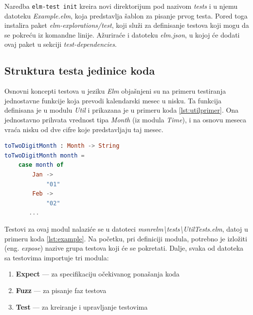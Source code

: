 \documentclass[12pt,oneside]{memoir}
\begin{document}
Naredba \texttt{elm-test init} kreira novi direktorijum pod nazivom \emph{tests} i u njemu datoteku \emph{Example.elm}, koja predstavlja šablon za pisanje prvog testa. Pored toga instalira paket \emph{elm-explorations/test}, koji služi za definisanje testova koji mogu da se pokreću iz komandne linije. Ažuriraće i datoteku \emph{elm.json}, u kojoj će dodati ovaj paket u sekciji \emph{test-dependencies}.

\subsection{Struktura testa jedinice koda}

\par Osnovni koncepti testova u jeziku \emph{Elm} objašnjeni su na primeru testiranja jednostavne funkcije koja prevodi kalendarski mesec u nisku. Ta funkcija definisana je u modulu \emph{Util} i prikazana je u primeru koda \ref{lst:utilprimer}. Ona jednostavno prihvata vrednost tipa \emph{Month} (iz modula \emph{Time}), i na osnovu meseca vraća nisku od dve cifre koje predstavljaju taj mesec.

\begin{minipage}{\linewidth}
\begin{lstlisting}[language=elm, basicstyle=\small, caption={Funkcija \emph{toTwoDigitMonth}},captionpos=b, label={lst:utilprimer}]
toTwoDigitMonth : Month -> String
toTwoDigitMonth month =
    case month of
        Jan ->
            "01"
        Feb ->
            "02"
       ...
\end{lstlisting}
\end{minipage}

\par Testovi za ovaj modul nalaziće se u datoteci \emph{msnr{\textunderscore}elm{\textbackslash}tests{\textbackslash}UtilTests.elm}, datoj u primeru koda \ref{lst:example}. Na početku, pri definiciji modula, potrebno je izložiti (eng. \emph{expose}) nazive grupa testova koji će se pokretati. Dalje, svaka od datoteka sa testovima importuje tri modula: 

\begin{enumerate}
\item \textbf{Expect} --- za specifikaciju očekivanog ponašanja koda
\item \textbf{Fuzz} --- za pisanje faz testova 
\item \textbf{Test} --- za kreiranje i upravljanje testovima
\end{enumerate}
\end{document}

